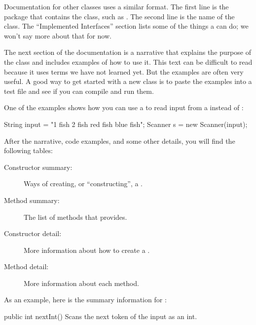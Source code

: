 Documentation for other classes uses a similar format.
The first line is the package that contains the class, such as .
The second line is the name of the class.
The ``Implemented Interfaces'' section lists some of the things a  can do; we won't say more about that for now.


The next section of the documentation is a narrative that explains the purpose of the class and includes examples of how to use it.
This text can be difficult to read because it uses terms we have not learned yet.
But the examples are often very useful.
A good way to get started with a new class is to paste the examples into a test file and see if you can compile and run them.

One of the examples shows how you can use a  to read input from a  instead of :

\begin{code}
String input = "1 fish 2 fish red fish blue fish";
Scanner s = new Scanner(input);
\end{code}

After the narrative, code examples, and some other details, you will find the following tables:

\begin{description}

\item[Constructor summary:]
Ways of creating, or ``constructing'', a .

\item[Method summary:]
The list of methods that  provides.

\item[Constructor detail:]
More information about how to create a .

\item[Method detail:]
More information about each method.

\end{description}

As an example, here is the summary information for :

\begin{stdout}
public int nextInt()
Scans the next token of the input as an int.
\end{stdout}

